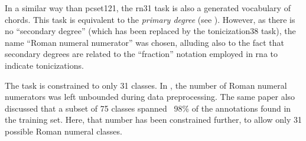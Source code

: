 
In a similar way than \gls{pcset121}, the \gls{rn31} task is
also a generated vocabulary of chords. This task is
equivalent to the \emph{primary degree} (see
). However, as there is no
``secondary degree'' (which has been replaced by the
\gls{tonicization38} task), the name ``Roman numeral
numerator'' was chosen, alluding also to the fact that
secondary degrees are related to the ``fraction'' notation
employed in \gls{rna} to indicate tonicizations.

The task is constrained to only 31 classes. In
\parencite{napoleslopez2021augmentednet}, the number of
Roman numeral numerators was left unbounded during data
preprocessing. The same paper also discussed that a subset
of 75 classes spanned ~98\% of the annotations found in the
training set. Here, that number has been constrained
further, to allow only 31 possible Roman numeral classes.
